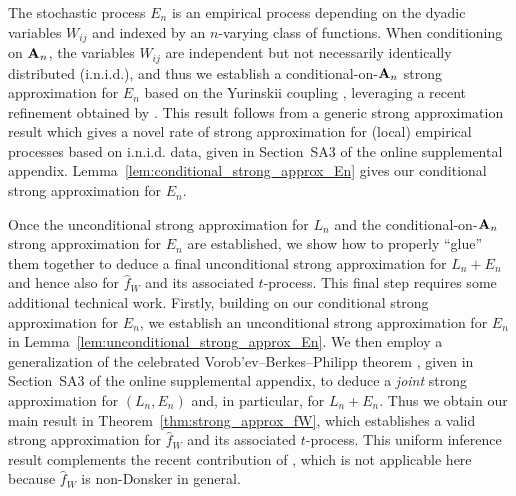 The stochastic process $E_n$ is an empirical process depending on the dyadic
variables $W_{ij}$ and indexed by an $n$-varying class of functions.
When conditioning on $\mathbf{A}_n$, the variables $W_{ij}$ are independent but not
necessarily identically distributed (i.n.i.d.), and thus we establish a
conditional-on-$\mathbf{A}_n$ strong
approximation for $E_n$ based on the Yurinskii coupling
\citep{yurinskii1978error}, leveraging a recent refinement obtained by
\citet*[Lemma~38]{belloni2019conditional}.
This result follows from a generic
strong approximation result which
gives a novel rate of strong approximation for
(local) empirical processes based on i.n.i.d. data,
given in
Section~SA3 of
the online supplemental appendix.
Lemma~\ref{lem:conditional_strong_approx_En}
gives our conditional strong approximation for $E_n$.

Once the unconditional strong approximation for $L_n$ and the
conditional-on-$\mathbf{A}_n$ strong approximation for $E_n$ are established,
we show how to properly ``glue'' them together to deduce a final unconditional
strong approximation for $L_n+E_n$ and hence also for $\widehat{f}_W$ and its
associated $t$-process. This final step requires some additional technical work.
Firstly, building on our conditional strong approximation for $E_n$, we
establish an unconditional strong approximation for $E_n$ in
Lemma~\ref{lem:unconditional_strong_approx_En}. We then employ a
generalization of the celebrated Vorob'ev--Berkes--Philipp theorem
\citep{dudley1999uniform}, given in
Section~SA3 of
the online supplemental appendix,
to deduce a \emph{joint} strong
approximation for $(L_n,E_n)$ and, in particular, for $L_n+E_n$.
Thus we obtain our main result in Theorem~\ref{thm:strong_approx_fW},
which establishes a valid strong approximation for $\widehat{f}_W$
and its associated $t$-process.
This uniform inference result complements the recent contribution of
\citet{davezies2021exchangeable}, which is not applicable
here because $\widehat{f}_W$ is non-Donsker in general.

